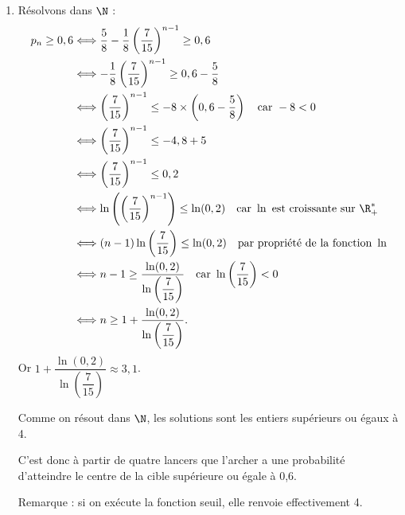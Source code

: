 \begin{enumerate}
\item Résolvons dans $\N$ :
\[
\begin{aligned}
p_n\geq 0,6&\Longleftrightarrow \dfrac58-\dfrac18\left(\dfrac7{15}\right)^{n-1}\geq 0,6\\
&\Longleftrightarrow -\dfrac18\left(\dfrac7{15}\right)^{n-1}\geq 0,6-\dfrac58\\
&\Longleftrightarrow \left(\dfrac7{15}\right)^{n-1}\leq -8\times \left(0,6-\dfrac58\right) \quad \text{car } -8<0\\
&\Longleftrightarrow \left(\dfrac7{15}\right)^{n-1}\leq -4,8+5\\
&\Longleftrightarrow \left(\dfrac7{15}\right)^{n-1}\leq 0,2\\
&\Longleftrightarrow \ln\left(\left(\dfrac7{15}\right)^{n-1}\right)\leq \ln(0,2) \quad \text{car } \ln \text{ est croissante sur }\R^{*}_{+}\\
&\Longleftrightarrow (n-1)\ln\left(\dfrac7{15}\right)\leq \ln(0,2) \quad \text{par propriété de la fonction }\ln\\
&\Longleftrightarrow n-1\geq \dfrac{\ln(0,2)}{\ln\left(\dfrac7{15}\right)} \quad \text{car } \ln\left(\dfrac7{15}\right)<0\\
&\Longleftrightarrow n\geq 1+\dfrac{\ln(0,2)}{\ln\left(\dfrac7{15}\right)}.
\end{aligned}
\]
Or $1+\dfrac{\ln(0,2)}{\ln\left(\dfrac7{15}\right)}\approx 3,1$.

Comme on résout dans $\N$, les solutions sont les entiers supérieurs ou égaux à 4.

C'est donc à partir de quatre lancers que l'archer a une probabilité d'atteindre le centre de la cible supérieure ou égale à 0,6.

Remarque : si on exécute la fonction seuil, elle renvoie effectivement 4.
\end{enumerate}
